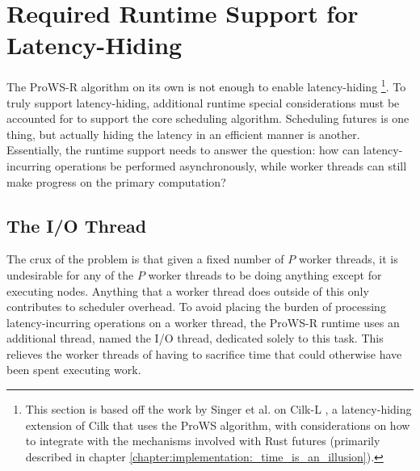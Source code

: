 \documentclass[bsc,frontabs,singlespacing,parskip,deptreport,normalheadings]{infthesis}
\begin{document}
\section{Required Runtime Support for Latency-Hiding}
\label{section:required_runtime_support_for_latency_hiding}

The ProWS-R algorithm on its own is not enough to enable latency-hiding
\footnote{This section is based off the work by Singer et al. on Cilk-L
\cite{singer_scheduling_2019}, a latency-hiding extension of Cilk that uses the
ProWS algorithm, with considerations on how to integrate with the mechanisms
involved with Rust futures (primarily described in chapter
\ref{chapter:implementation:_time_is_an_illusion}).}. To truly support
latency-hiding, additional runtime special considerations must be accounted for
to support the core scheduling algorithm. Scheduling futures is one thing, but
actually hiding the latency in an efficient manner is another. Essentially, the
runtime support needs to answer the question: how can latency-incurring
operations be performed asynchronously, while worker threads can still make
progress on the primary computation?

\subsection{The I/O Thread}

The crux of the problem is that given a fixed number of \(P\) worker threads, it
is undesirable for any of the \(P\) worker threads to be doing anything except
for executing nodes. Anything that a worker thread does outside of this only
contributes to scheduler overhead. To avoid placing the burden of processing
latency-incurring operations on a worker thread, the ProWS-R runtime uses an
additional thread, named the I/O thread, dedicated solely to this task. This
relieves the worker threads of having to sacrifice time that could otherwise
have been spent executing work.
\end{document}
